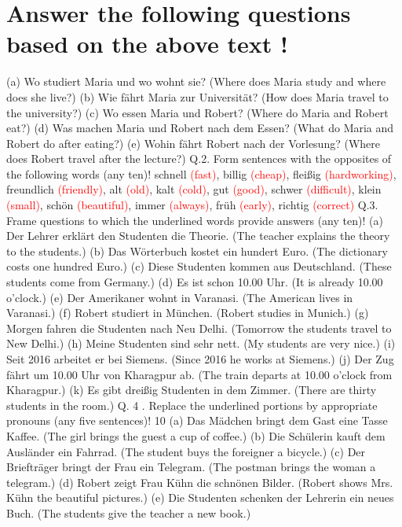\documentclass{article}
\begin{document}
\section*{Answer the following questions based on the above text !}
(a) Wo studiert Maria und wo wohnt sie? (Where does Maria study and where does she live?)
(b) Wie fährt Maria zur Universität? (How does Maria travel to the university?)
(c) Wo essen Maria und Robert? (Where do Maria and Robert eat?)
(d) Was machen Maria und Robert nach dem Essen? (What do Maria and Robert do after eating?)
(e) Wohin fährt Robert nach der Vorlesung? (Where does Robert travel after the lecture?)
Q.2. Form sentences with the opposites of the following words (any ten)!
schnell \textcolor{red}{(fast)}, billig \textcolor{red}{(cheap)}, fleißig \textcolor{red}{(hardworking)}, freundlich \textcolor{red}{(friendly)}, alt \textcolor{red}{(old)}, kalt \textcolor{red}{(cold)}, gut \textcolor{red}{(good)}, schwer \textcolor{red}{(difficult)}, klein \textcolor{red}{(small)}, schön \textcolor{red}{(beautiful)}, immer \textcolor{red}{(always)}, früh \textcolor{red}{(early)}, richtig \textcolor{red}{(correct)}
Q.3. Frame questions to which the underlined words provide answers (any ten)!
(a) Der Lehrer erklärt den Studenten die Theorie. (The teacher explains the theory to the students.)
(b) Das Wörterbuch kostet ein hundert Euro. (The dictionary costs one hundred Euro.)
(c) Diese Studenten kommen aus Deutschland. (These students come from Germany.)
(d) Es ist schon 10.00 Uhr. (It is already 10.00 o'clock.)
(e) Der Amerikaner wohnt in Varanasi. (The American lives in Varanasi.)
(f) Robert studiert in München. (Robert studies in Munich.)
(g) Morgen fahren die Studenten nach Neu Delhi. (Tomorrow the students travel to New Delhi.)
(h) Meine Studenten sind sehr nett. (My students are very nice.)
(i) Seit 2016 arbeitet er bei Siemens. (Since 2016 he works at Siemens.)
(j) Der Zug fährt um 10.00 Uhr von Kharagpur ab. (The train departs at 10.00 o'clock from Kharagpur.)
(k) Es gibt dreißig Studenten in dem Zimmer. (There are thirty students in the room.)
Q. 4 . Replace the underlined portions by appropriate pronouns (any five sentences)! 10
(a) Das Mädchen bringt dem Gast eine Tasse Kaffee. (The girl brings the guest a cup of coffee.)
(b) Die Schülerin kauft dem Ausländer ein Fahrrad. (The student buys the foreigner a bicycle.)
(c) Der Briefträger bringt der Frau ein Telegram. (The postman brings the woman a telegram.)
(d) Robert zeigt Frau Kühn die schnönen Bilder. (Robert shows Mrs. Kühn the beautiful pictures.)
(e) Die Studenten schenken der Lehrerin ein neues Buch. (The students give the teacher a new book.)
\end{document}
